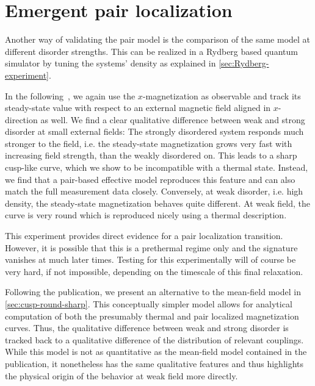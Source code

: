\newpage
{}


\section{Emergent pair localization}
Another way of validating the pair model is the comparison of the same model at different disorder strengths. This can be realized in a Rydberg based quantum simulator by tuning the systems' density as explained in \autoref{sec:Rydberg-experiment}.

In the following~\cite{franzEmergentPairLocalization2024}, we again use the $x$-magnetization as observable and track its steady-state value with respect to an external magnetic field aligned in $x$-direction as well. We find a clear qualitative difference between weak and strong disorder at small external fields: The strongly disordered system responds much stronger to the field, i.e. the steady-state magnetization grows very fast with increasing field strength, than the weakly disordered on. This leads to a sharp cusp-like curve, which we show to be incompatible with a thermal state. Instead, we find that a pair-based effective model reproduces this feature and can also match the full measurement data closely.
Conversely, at weak disorder, i.e. high density, the steady-state magnetization behaves quite different. At weak field, the curve is very round which is reproduced nicely using a thermal description.

This experiment provides direct evidence for a pair localization transition. However, it is possible that this is a prethermal regime only and the signature vanishes at much later times. Testing for this experimentally will of course be very hard, if not impossible, depending on the timescale of this final relaxation.

Following the publication, we present an alternative to the mean-field model in \autoref{sec:cusp-round-sharp}. This conceptually simpler model allows for analytical computation of both the presumably thermal and pair localized magnetization curves. Thus, the qualitative difference between weak and strong disorder is tracked back to a qualitative difference of the distribution of relevant couplings. 
While this model is not as quantitative as the mean-field model contained in the publication, it nonetheless has the same qualitative features and thus highlights the physical origin of the behavior at weak field more directly.

